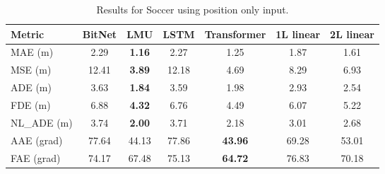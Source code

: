 \begin{table}[H]
\centering
\caption{Results for Soccer using position only input.}
\label{pos:SOC1}
\begin{tabular}{l||c|c|c|c|c|c}
Metric & BitNet & LMU & LSTM& Transformer & 1L linear & 2L linear \\
\hline \hline
MAE (m) & 2.29 & \textbf{1.16} & 2.27 & 1.25 & 1.87 & 1.61 \\
MSE (m) & 12.41 & \textbf{3.89 } & 12.18  & 4.69 & 8.29 & 6.93 \\
ADE (m) & 3.63 & \textbf{1.84} & 3.59 & 1.98 & 2.93 & 2.54 \\
FDE (m) & 6.88 & \textbf{4.32} & 6.76 & 4.49 & 6.07 & 5.22 \\
NL\_ADE (m) & 3.74 & \textbf{2.00} & 3.71 & 2.18 & 3.01 & 2.68 \\
AAE (grad) & 77.64 & 44.13 & 77.86 & \textbf{43.96} & 69.28 & 53.01 \\
FAE (grad) & 74.17 & 67.48 & 75.13 & \textbf{64.72} & 76.83 & 70.18 \\
\end{tabular}
\end{table}